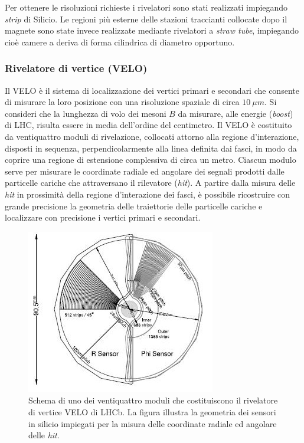 Per ottenere le risoluzioni richieste i rivelatori sono stati realizzati impiegando \emph{strip} di Silicio. Le regioni pi\`u esterne delle stazioni traccianti collocate dopo il magnete sono state invece realizzate mediante rivelatori a \emph{straw tube}, impiegando cio\`e camere a deriva di forma cilindrica di diametro opportuno.

\subsubsection{Rivelatore di vertice (VELO)}
\noindent
Il VELO \`e il sistema di localizzazione dei vertici primari e secondari che consente di misurare la loro posizione con una risoluzione spaziale di circa $10\ \mu m$. 
 Si consideri che la lunghezza di volo dei mesoni $B$ da misurare, alle energie (\emph{boost}) di LHC, risulta essere in media dell'ordine del centimetro. 
Il VELO  \`e costituito da ventiquattro moduli di rivelazione, collocati attorno alla regione d'interazione, disposti in sequenza, perpendicolarmente alla linea definita dai fasci, in modo da coprire una regione di estensione complessiva di circa un metro. Ciascun modulo serve per misurare le coordinate radiale ed angolare dei segnali prodotti dalle particelle cariche che attraversano il rilevatore (\emph{hit}). A partire dalla misura delle \emph{hit} in prossimit\`a della regione d'interazione dei fasci, \`e possibile ricostruire con grande precisione la geometria delle traiettorie delle particelle cariche e localizzare con precisione i vertici primari e secondari. 
\begin{figure}[h]
\centering
\includegraphics[scale=1]{Immagini/velo1}
\caption{Schema di uno dei ventiquattro moduli che costituiscono il rivelatore di vertice VELO di LHCb. La figura illustra la geometria dei sensori in silicio impiegati per la misura delle coordinate radiale ed angolare delle \emph{hit}.}
\label{fig:velo2}
\end{figure}
%
